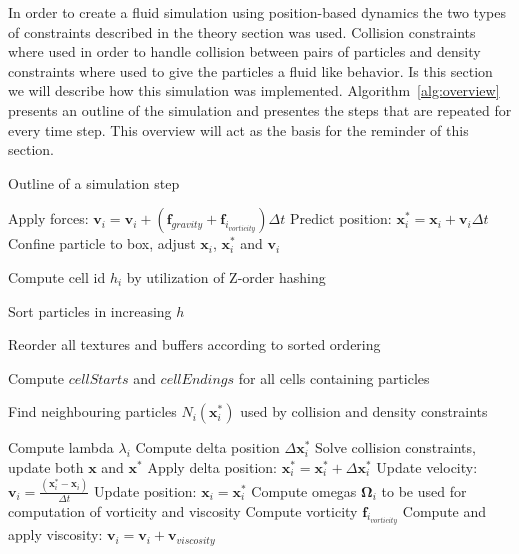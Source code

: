 In order to create a fluid simulation using position-based dynamics the two
types of constraints described in the theory section was used. Collision
constraints where used in order to handle collision between pairs of particles
and density constraints where used to give the particles a fluid like behavior.
Is this section we will describe how this simulation was implemented.
Algorithm~\ref{alg:overview} presents an outline of the simulation and
presentes the steps that are repeated for every time step. This overview will
act as the basis for the reminder of this section.

\begin{algorithm}
\caption{Outline of a simulation step}
\label{alg:overview}
\begin{algorithmic}[1]
\small

\State Apply forces: $\mathbf{v}_{i} = \mathbf{v}_{i} + (\mathbf{f}_{gravity} + \mathbf{f}_{i_{vorticity}})\Delta t$
\State Predict position: $\mathbf{x}_{i}^{*}= \mathbf{x}_{i} + \mathbf{v}_{i} \Delta t$
\State Confine particle to box, adjust $\mathbf{x}_{i}$, $\mathbf{x}_{i}^{*}$ and $\mathbf{v}_{i}$
\EndFor


\State Compute cell id $h_{i}$ by utilization of Z-order hashing
\EndFor

\State Sort particles in increasing $h$

\State Reorder all textures and buffers according to sorted ordering

\State Compute $cellStarts$ and $cellEndings$ for all cells containing particles


\State Find neighbouring particles $N_{i}(\mathbf{x}_{i}^{*})$ used by collision and density constraints
\EndFor

\State Compute lambda $\lambda_{i}$
\EndFor
{}
\State Compute delta position $\Delta \mathbf{x}_{i}^{*}$
\EndFor
{}
\State Solve collision constraints, update both $\mathbf{x}$ and $\mathbf{x}^{*}$
\EndWhile
{}
\State Apply delta position: $\mathbf{x}_{i}^{*} = \mathbf{x}_{i}^{*} + \Delta \mathbf{x}_{i}^{*}$
\EndFor
\EndWhile
{}
\State Update velocity: $\mathbf{v}_{i} = \frac{(\mathbf{x}_{i}^{*} - \mathbf{x}_{i})}{\Delta t}$
\State Update position: $\mathbf{x}_{i} = \mathbf{x}_{i}^{*}$
\EndFor
{}
\State Compute omegas $\mathbf{\Omega}_{i}$ to be used for computation of vorticity and viscosity
\EndFor
{}
\State Compute vorticity $\mathbf{f}_{i_{vorticity}}$
\EndFor
{}
\State Compute and apply viscosity: $\mathbf{v}_{i} = \mathbf{v}_{i} + \mathbf{v}_{viscosity}$
\EndFor

\end{algorithmic}
\end{algorithm}

